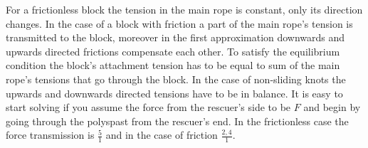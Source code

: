 \documentclass[11pt]{article}
\begin{document}

\solueng
For a frictionless block the tension in the main rope is constant, only its direction changes. In the case of a block with friction a part of the main rope’s tension is transmitted to the block, moreover in the first approximation downwards and upwards directed frictions compensate each other. To satisfy the equilibrium condition the block’s attachment tension has to be equal to sum of the main rope’s tensions that go through the block. In the case of non-sliding knots the upwards and downwards directed tensions have to be in balance. It is easy to start solving if you assume the force from the rescuer’s side to be $F$ and begin by going through the polyspast from the rescuer’s end. In the frictionless case the force transmission is $\frac{5}{1}$ and in the case of friction $\frac{2,4}{1}$. 
\end{document}
